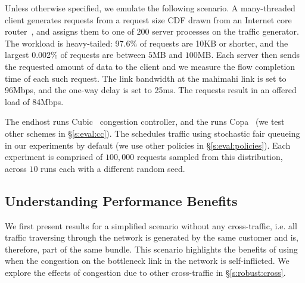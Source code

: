 Unless otherwise specified, we emulate the following scenario.
A many-threaded client generates requests from a request size CDF drawn from an Internet core router~\cite{caida-dataset}, and assigns them to one of $200$ server processes on the traffic generator.
The workload is heavy-tailed: 97.6\% of requests are 10KB or shorter, and the largest 0.002\% of requests are between $5$MB and $100$MB.
Each server then sends the requested amount of data to the client and we measure the flow completion time of each such request. 
The link bandwidth at the mahimahi link is set to 96Mbps, and the one-way delay is set to 25ms. The requests result in an offered load of 84Mbps. 

The endhost runs Cubic~\cite{cubic} congestion controller, and the \inbox runs Copa~\cite{copa} (we test other schemes in \S\ref{s:eval:cc}). The \inbox schedules traffic using stochastic fair queueing~\cite{sfq} in our experiments by default (we use other policies in \S\ref{s:eval:policies}). Each experiment is comprised of $100,000$ requests sampled from this distribution, across $10$ runs each with a different random seed. 



\subsection{Understanding Performance Benefits}\label{s:eval:fct}

We first present results for a simplified scenario without any cross-traffic, i.e. all traffic traversing through the network is generated by the same customer and is, therefore, part of the same bundle. 
This scenario highlights the benefits of using \name when the congestion on the bottleneck link in the network is self-inflicted. We explore the effects of congestion due to other cross-traffic in \S\ref{s:robust:cross}.

